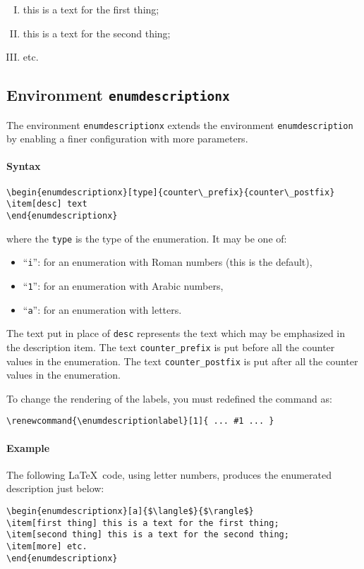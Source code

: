 \documentclass[book,taskpackage,specpackage,codepackage]{upmethodology-document}
\begin{document}
\begin{enumerate}[I.]
\item this is a text for the first thing;
\item this is a text for the second thing;
\item etc.
\end{enumerate}

\subsection{Environment \texttt{enumdescriptionx}}

The environment \texttt{enumdescriptionx} extends the environment \texttt{enumdescription} by enabling a finer configuration with more parameters.

\paragraph{Syntax}
\begin{verbatim}
\begin{enumdescriptionx}[type]{counter\_prefix}{counter\_postfix}
\item[desc] text
\end{enumdescriptionx}
\end{verbatim}
where the \texttt{type} is the type of the enumeration. It may be one of:
\begin{itemize}
\item ``\texttt{i}'': for an enumeration with Roman numbers (this is the default),
\item ``\texttt{1}'': for an enumeration with Arabic numbers,
\item ``\texttt{a}'': for an enumeration with letters.
\end{itemize}
The text put in place of \texttt{desc} represents the text which may be emphasized in the description item.
The text \texttt{counter\_prefix} is put before all the counter values in the enumeration.
The text \texttt{counter\_postfix} is put after all the counter values in the enumeration.


To change the rendering of the labels, you must redefined the command as:
\begin{verbatim}
\renewcommand{\enumdescriptionlabel}[1]{ ... #1 ... }
\end{verbatim}


\paragraph{Example} The following \LaTeX~code, using letter numbers, produces the enumerated description just below:
\begin{verbatim}
\begin{enumdescriptionx}[a]{$\langle$}{$\rangle$}
\item[first thing] this is a text for the first thing;
\item[second thing] this is a text for the second thing;
\item[more] etc.
\end{enumdescriptionx}
\end{verbatim}
\end{document}
